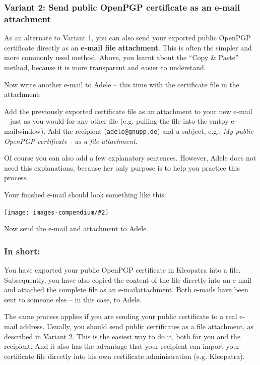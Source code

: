\documentclass[a4paper,11pt,oneside,openright,titlepage]{scrbook}
\newcommand{\Menu}[1]{\textit{#1}}
\newcommand{\Filename}[1]{\small{\texttt{#1}}\normalsize}
\newcommand{\Email}{e-mail}
\newcommand{\IncludeImage}[2][]{
\begin{center}
  \texttt{[image: images-compendium/\#2]}%
\end{center}
}
\begin{document}
\clearpage
\subsubsection{Variant 2: Send public OpenPGP certificate as an \Email{} attachment}

As an alternate to Variant 1, you can also send your exported public
OpenPGP certificate directly as an \textbf{\Email{} file
attachment}. This is often the simpler and more commonly used method.
Above, you learnt about the ``Copy \& Paste'' method,
because it is more transparent and easier to understand.

Now write another \Email{} to Adele -- this time with the certificate
file in the attachment:

Add the previously exported certificate file as an attachment to your
new \Email{} -- just as you would for any other file (e.g. pulling the
file into the emtpy \Email window).  Add the recipient
(\Filename{adele@gnupp.de}) and a subject, e.g.: \Menu{My public
OpenPGP certificate - as a file attachment}.

Of course you can also add a few explanatory sentences.  However,
Adele does not need this explanations, because her only purpose is to
help you practice this process.

Your finished \Email{} should look something like this:
\enlargethispage{2\baselineskip}

\IncludeImage[width=0.85\textwidth]{sc-ol-adele-sendOpenpgpKey-attachment_en}

Now send the \Email{} and attachment to Adele.

\clearpage
\subsubsection{In short:}

You have exported your public OpenPGP certificate in Kleopatra into a
file. Subsequently, you have also copied the content of the file
directly into an \Email{} and attached the complete file as an
\Email{}attachment. Both \Email{}s have been sent to someone else
-- in this case, to Adele.

The same process applies if you are sending your public certificate to
a real \Email{} address. Usually, you should send public certificates
as a file attachment, as described in Variant 2. This is the easiest
way to do it, both for you and the recipient. And it also has the
advantage that your recipient can import your certificate file
directly into his own certificate administration (e.g. Kleopatra).
\end{document}
